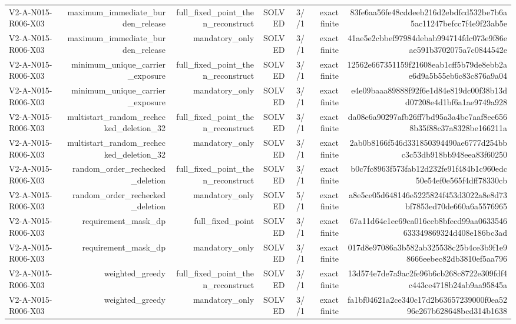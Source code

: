{\begin{longtable}{lrrrrrr}
V2-A-N015-R006-X03 & maximum\_immediate\_burden\_release & full\_fixed\_point\_then\_reconstruct & SOLVED & 3//1 & exact finite & 83fe6aa56fe48cddeeb216d2ebdfcd532be7b6a5ac11247befcc7f4e9f23ab5e \\
V2-A-N015-R006-X03 & maximum\_immediate\_burden\_release & mandatory\_only & SOLVED & 3//1 & exact finite & 41ae5e2cbbef97984debab994714fdc073e9f86eae591b3702075a7c0844542e \\
V2-A-N015-R006-X03 & minimum\_unique\_carrier\_exposure & full\_fixed\_point\_then\_reconstruct & SOLVED & 3//1 & exact finite & 12562e667351159f21608eab1cff5b79de8ebb2ae6d9a5b55eb6c83c876a9a04 \\
V2-A-N015-R006-X03 & minimum\_unique\_carrier\_exposure & mandatory\_only & SOLVED & 3//1 & exact finite & e4e09baaa89888f92f6e1d84e819dc00f38b13dd07208e4d1bf6a1ae9749a928 \\
V2-A-N015-R006-X03 & multistart\_random\_rechecked\_deletion\_32 & full\_fixed\_point\_then\_reconstruct & SOLVED & 3//1 & exact finite & da08e6a90297afb26ff7bd95a3a4bc7aaf8ee6568b35f88c37a8328be166211a \\
V2-A-N015-R006-X03 & multistart\_random\_rechecked\_deletion\_32 & mandatory\_only & SOLVED & 3//1 & exact finite & 2ab0b8166f546d331850394490ae6777d254bbc3c53db918bb948eea83f60250 \\
V2-A-N015-R006-X03 & random\_order\_rechecked\_deletion & full\_fixed\_point\_then\_reconstruct & SOLVED & 3//1 & exact finite & b0c7fc8963f573fab12d232fe91f484b1c960edc50e54ef0e565f4dff78330cb \\
V2-A-N015-R006-X03 & random\_order\_rechecked\_deletion & mandatory\_only & SOLVED & 5//1 & exact finite & a8e5ce05d648146e5225824f453d3022a8e8d73bf7853ed70de660a6a5576965 \\
V2-A-N015-R006-X03 & requirement\_mask\_dp & full\_fixed\_point & SOLVED & 3//1 & exact finite & 67a11d64e1ee69ca016ceb8bfecd99aa0633546633349869324d408e186bc3ad \\
V2-A-N015-R006-X03 & requirement\_mask\_dp & mandatory\_only & SOLVED & 3//1 & exact finite & 017d8e97086a3b582ab325538c25b4ce3b9f1e98666eebec82db3810ef5aa796 \\
V2-A-N015-R006-X03 & weighted\_greedy & full\_fixed\_point\_then\_reconstruct & SOLVED & 3//1 & exact finite & 13d574e7de7a9ac2fe96b6cb268c8722e309fdf4c443ce4718b24ab9aa95845a \\
V2-A-N015-R006-X03 & weighted\_greedy & mandatory\_only & SOLVED & 3//1 & exact finite & fa1bf04621a2ce340c17d2b63657239000f0ea5296e267b628648bcd314b1638 \\

\end{longtable}}
